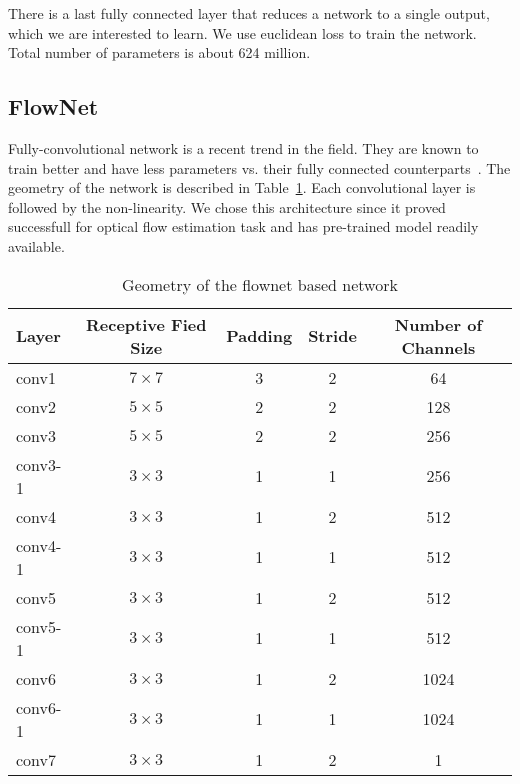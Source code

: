 There is a last fully connected layer that reduces a network to a
single output, which we are interested to learn.  We use euclidean
loss to train the network.  Total number of parameters is about 624
million.


\subsection{FlowNet}

Fully-convolutional network is a recent trend in the field.  They are
known to train better and have less parameters vs. their fully
connected counterparts~\cite{long2015fully}. The geometry of the
network is described in Table~\ref{tab:flownet_geometry}. Each
convolutional layer is followed by the non-linearity.  We chose this
architecture since it proved successfull for optical flow estimation
task and has pre-trained model readily available.

\begin{table}[ht]
  \begin{tabular}{lcccc}
    \toprule
    \textbf{Layer} & \textbf{Receptive Fied Size} & \textbf{Padding} & \textbf{Stride} & \textbf{Number of Channels}\\
    \midrule
    conv1&   $7\times 7$& 3& 2&   64\\
    conv2&   $5\times 5$& 2& 2&  128\\
    conv3&   $5\times 5$& 2& 2&  256\\
    conv3-1& $3\times 3$& 1& 1&  256\\
    conv4&   $3\times 3$& 1& 2&  512\\
    conv4-1& $3\times 3$& 1& 1&  512\\
    conv5&   $3\times 3$& 1& 2&  512\\
    conv5-1& $3\times 3$& 1& 1&  512\\
    conv6&   $3\times 3$& 1& 2& 1024\\
    conv6-1& $3\times 3$& 1& 1& 1024\\
    conv7&   $3\times 3$& 1& 2&    1\\
    \hline
  \end{tabular}
  \caption{Geometry of the flownet based network}
  \label{tab:flownet_geometry}
\end{table}

